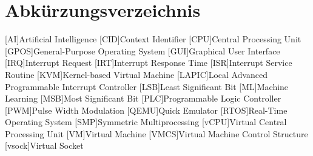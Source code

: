 \documentclass[MMR,Master,english]{style/twbook}
\providecommand\listacroname{}
\renewcommand\listacroname{List of Abbreviations}
\renewcommand\listacroname{Abkürzungsverzeichnis}
\begin{document}
\chapter*{\listacroname}
\begin{acronym}[XXXXX]
	[AI]{Artificial Intelligence}
	[CID]{Context Identifier}
	[CPU]{Central Processing Unit}
	[GPOS]{General-Purpose Operating System}
	[GUI]{Graphical User Interface}
	[IRQ]{Interrupt Request}
	[IRT]{Interrupt Response Time}
	[ISR]{Interrupt Service Routine}
	[KVM]{Kernel-based Virtual Machine}
	[LAPIC]{Local Advanced Programmable Interrupt Controller}
	[LSB]{Least Significant Bit}
	[ML]{Machine Learning}
	[MSB]{Most Significant Bit}
	[PLC]{Programmable Logic Controller}
	[PWM]{Pulse Width Modulation}
	[QEMU]{Quick Emulator}
	[RTOS]{Real-Time Operating System}
	[SMP]{Symmetric Multiprocessing}
	[vCPU]{Virtual Central Processing Unit}
	[VM]{Virtual Machine}
	[VMCS]{Virtual Machine Control Structure}
	[vsock]{Virtual Socket}
\end{acronym}
\end{document}
